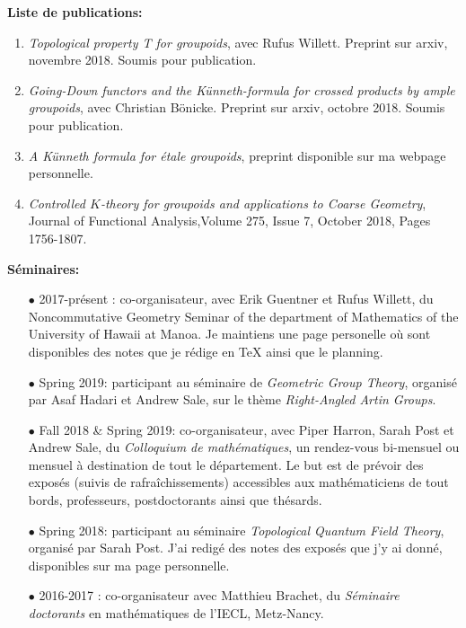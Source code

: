 \documentclass[a4paper,11pt]{article}
\newcommand\espace{\vrule height 20pt width 0pt}
\begin{document}
\textbf{Liste de publications:} 
\begin{enumerate}
\item \textit{Topological property T for groupoids}, avec Rufus Willett. Preprint sur arxiv, novembre 2018. Soumis pour publication.
\item \textit{Going-Down functors and the Künneth-formula for crossed products by ample groupoids}, avec Christian Bönicke. Preprint sur arxiv, octobre 2018. Soumis pour publication.
\item \textit{A K\"{u}nneth formula for \'etale groupoids}, preprint disponible sur ma webpage personnelle.
\item \textit{Controlled $K$-theory for groupoids and applications to Coarse Geometry}, Journal of Functional Analysis,Volume 275, Issue 7, October 2018, Pages 1756-1807. 
\end{enumerate}

\espace

\textbf{S\'eminaires:} \\

\begin{itemize}
\item[$\bullet$] 2017-pr\'esent : co-organisateur, avec Erik Guentner et Rufus Willett, du Noncommutative Geometry Seminar of the department of Mathematics of the University of Hawaii at Manoa. Je maintiens une page personelle o\`u sont disponibles des notes que je r\'edige en TeX ainsi que le planning.\\

\item[$\bullet$] Spring 2019: participant au s\'eminaire de \textit{Geometric Group Theory}, organis\'e par Asaf Hadari et Andrew Sale, sur le th\`eme \textit{Right-Angled Artin Groups}.  \\
\item[$\bullet$] Fall 2018 \& Spring 2019: co-organisateur, avec Piper Harron, Sarah Post et Andrew Sale, du \textit{Colloquium de math\'ematiques}, un rendez-vous bi-mensuel ou mensuel \`a destination de tout le d\'epartement. Le but est de pr\'evoir des expos\'es (suivis de rafra\^{i}chissements) accessibles aux math\'ematiciens de tout bords, professeurs, postdoctorants ainsi que th\'esards.\\
\item[$\bullet$] Spring 2018: participant au s\'eminaire \textit{Topological Quantum Field Theory}, organis\'e par Sarah Post. J'ai redig\'e des notes des expos\'es que j'y ai donn\'e, disponibles sur ma page personnelle. \\
\item[$\bullet$] 2016-2017 : co-organisateur avec Matthieu Brachet, du \textit{S\'eminaire doctorants} en math\'ematiques de l'IECL, Metz-Nancy.
\end{itemize}
\end{document}
